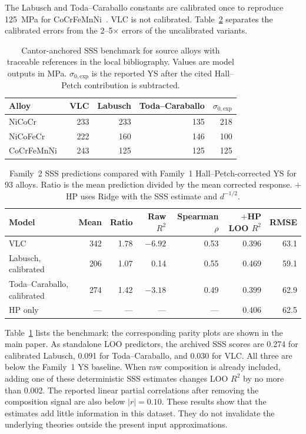 \documentclass[a4paper,11pt]{article}
\begin{document}
The Labusch and Toda--Caraballo constants are calibrated once to reproduce \SI{125}{MPa} for CoCrFeMnNi~\cite{Otto2013}. VLC is not calibrated. Table~\ref{tab:sss} separates the calibrated errors from the 2--5$\times$ errors of the uncalibrated variants.

\begin{table}[H]
\centering
\caption{Cantor-anchored SSS benchmark for source alloys with traceable references in the local bibliography. Values are model outputs in MPa. $\sigma_{0,\mathrm{exp}}$ is the reported YS after the cited Hall--Petch contribution is subtracted.}
\label{tab:sssbenchmark}
\small
\begin{tabular}{lrrrr}
\toprule
Alloy & VLC & Labusch & Toda--Caraballo & $\sigma_{0,\mathrm{exp}}$ \\
\midrule
NiCoCr~\cite{Yoshida2017} & 233 & 233 & 135 & 218 \\
NiCoFeCr~\cite{Wu2014} & 222 & 160 & 146 & 100 \\
CoCrFeMnNi~\cite{Otto2013} & 243 & 125 & 125 & 125 \\
\bottomrule
\end{tabular}
\end{table}

\begin{table}[H]
\centering
\caption{Family~2 SSS predictions compared with Family~1 Hall--Petch-corrected YS for 93 alloys. Ratio is the mean prediction divided by the mean corrected response. $+$HP uses Ridge with the SSS estimate and $d^{-1/2}$.}
\label{tab:sss}
\small
\setlength{\tabcolsep}{5pt}
\begin{tabular}{lrrrrrr}
\toprule
Model & Mean & Ratio & Raw $R^2$ & Spearman $\rho$ & $+$HP LOO $R^2$ & RMSE \\
\midrule
VLC & 342 & 1.78 & $-6.92$ & 0.53 & 0.396 & 63.1 \\
Labusch, calibrated & 206 & 1.07 & 0.14 & 0.55 & 0.469 & 59.1 \\
Toda--Caraballo, calibrated & 274 & 1.42 & $-3.18$ & 0.49 & 0.399 & 62.9 \\
HP only & --- & --- & --- & --- & 0.406 & 62.5 \\
\bottomrule
\end{tabular}
\end{table}

Table~\ref{tab:sssbenchmark} lists the benchmark; the corresponding parity plots are shown in the main paper. As standalone LOO predictors, the archived SSS scores are 0.274 for calibrated Labusch, 0.091 for Toda--Caraballo, and 0.030 for VLC. All three are below the Family~1 YS baseline. When raw composition is already included, adding one of these deterministic SSS estimates changes LOO $R^2$ by no more than 0.002. The reported linear partial correlations after removing the composition signal are also below $|r|=0.10$. These results show that the estimates add little information in this dataset. They do not invalidate the underlying theories outside the present input approximations.
\end{document}
